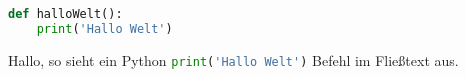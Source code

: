 \documentclass[12pt,ngerman,parskip=full]{scrartcl}
\begin{document}
\blindtext

\begin{lstlisting}[language={Python}]
def halloWelt():
    print('Hallo Welt')
\end{lstlisting}


Hallo, so sieht ein Python \lstinline[language={Python}]{print('Hallo Welt')} Befehl im Fließtext aus.




\end{document}

